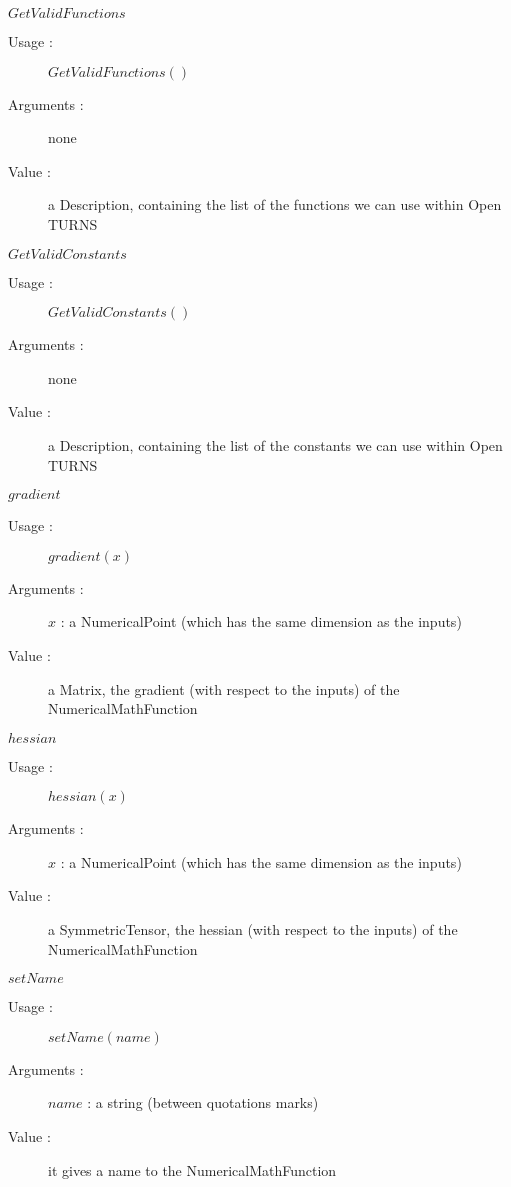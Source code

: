 \begin{description}
\begin{description}
  \item $GetValidFunctions$
    \begin{description}
    \item[Usage :] $GetValidFunctions()$
    \item[Arguments :] none
    \item[Value :] a Description, containing the list of the functions we can use within Open TURNS
    \end{description}
    \bigskip


  \item $GetValidConstants$
    \begin{description}
    \item[Usage :] $GetValidConstants()$
    \item[Arguments :] none
    \item[Value :] a Description, containing the list of the constants we can use within Open TURNS
    \end{description}
    \bigskip


  \item $gradient$
    \begin{description}
    \item[Usage :] $gradient(x)$
    \item[Arguments :] $x$ : a NumericalPoint (which has the same dimension as the inputs)
    \item[Value :] a Matrix, the gradient (with respect to the inputs) of the
      NumericalMathFunction
    \end{description}
    \bigskip

  \item $hessian$
    \begin{description}
    \item[Usage :] $hessian(x)$
    \item[Arguments :] $x$ : a NumericalPoint (which has the same dimension as the inputs)
    \item[Value :] a SymmetricTensor, the hessian (with respect to the inputs) of the
      NumericalMathFunction
    \end{description}
    \bigskip

  \item $setName$
    \begin{description}
    \item[Usage :] $setName(name)$
    \item[Arguments :] $name$ : a string (between quotations marks)
    \item[Value :] it gives a name to the NumericalMathFunction
    \end{description}

  \end{description}

\end{description}



